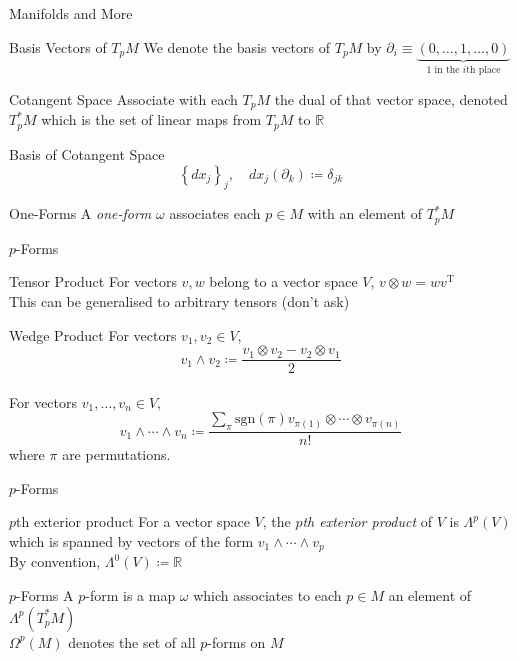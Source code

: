 \documentclass{beamer}
\newcommand{\Real}{\mathbb{R}}
\begin{document}
  \begin{frame}{Manifolds and More}
      \pause
      \begin{block}{Basis Vectors of $T_p M$}
          We denote the basis vectors of $T_p M$ by $\partial_i \equiv
          \underbrace{(0, \ldots, 1, \ldots, 0)}_{\text{1 in the $i$th place}}$
      \end{block}
      \pause
      \begin{block}{Cotangent Space}
          Associate with each $T_p M$ the dual of that vector space, denoted
          $T^*_p M$ which is the set of linear maps from $T_p M$ to $\Real$
      \end{block}
      \pause
      \begin{block}{Basis of Cotangent Space}
          $$\left\{ dx_j \right\}_j, \quad dx_j(\partial_k) \coloneqq
          \delta_{jk}$$
      \end{block}
      \pause
      \begin{block}{One-Forms}
          A \textit{one-form} $\omega$ associates each $p \in M$ with an
          element of $T^*_p M$
      \end{block}
  \end{frame}
  \begin{frame}{$p$-Forms}
      \pause
      \begin{block}{Tensor Product}
          For vectors $v, w$ belong to a vector space $V$, $v
          \otimes w = wv^{\mathrm{T}}$\pause\\
          This can be generalised to arbitrary tensors (\alert{don't ask})
      \end{block}
      \pause
      \begin{block}{Wedge Product}
          For vectors $v_1, v_2 \in V$, $$v_1 \wedge v_2 \coloneqq \frac{v_1
          \otimes v_2 - v_2 \otimes v_1}{2}$$ \pause \\
          For vectors $v_1, \ldots, v_n \in V$, $$v_1 \wedge \cdots \wedge v_n
          \coloneqq \frac{\sum_{\pi} \mathrm{sgn}(\pi) v_{\pi(1)} \otimes
          \cdots \otimes v_{\pi(n)}}{n!}$$
          where $\pi$ are permutations.
      \end{block}
  \end{frame}
  \begin{frame}{$p$-Forms}
      \pause
      \begin{block}{$p$th exterior product}
          For a vector space $V$, the \textit{$p$th exterior product} of $V$ is
          $\Lambda^p(V)$ which is spanned by vectors of the form $v_1 \wedge
          \cdots \wedge v_p$ \pause \\
          By convention, $\Lambda^0(V) \coloneqq \Real$
      \end{block}
      \pause
      \begin{block}{$p$-Forms}
          A $p$-form is a map $\omega$ which associates to each $p \in M$ an
          element of $\Lambda^p(T_p^* M)$ \pause \\
          $\Omega^p (M)$ denotes the set of all $p$-forms on $M$
      \end{block}
  \end{frame}
\end{document}
